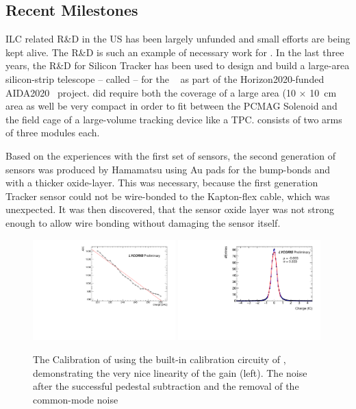 \subsection{Recent Milestones}
ILC related R\&D in the US has been largely unfunded and small efforts are being kept alive. The \KPIX R\&D is such an example of necessary work for \SID.
In the last three years, the R\&D for \KPIX Silicon Tracker has been used to design and build a large-area silicon-strip 
telescope -- called \LYCORIS -- for the \DIITBF~\cite{desytb2018} as part of the Horizon2020-funded AIDA2020~\cite{AIDA2020} project.
\LYCORIS did require both the coverage of a large area (10 $\times$ \SI{10}{\centi\meter} area as well be very compact in order to fit
between the PCMAG Solenoid and the field cage of a large-volume tracking device like a TPC. \LYCORIS consists of two arms of three modules each.

Based on the experiences with the first set of sensors, the second generation of sensors was produced by Hamamatsu 
using Au pads for the \KPIX bump-bonds and with a thicker oxide-layer. This was necessary, because the first generation Tracker sensor could not be 
wire-bonded to the Kapton-flex cable, which was unexpected. It was then discovered, that the sensor oxide layer was not strong enough 
to allow wire bonding without damaging the sensor itself.

\begin{figure}
\includegraphics[width=0.49\textwidth]{Tracker/KPIX/KPIX_Calib_DAC_c0_k0_b0_r0.pdf}
\includegraphics[width=0.49\textwidth]{Tracker/KPIX/KPIX_Gaussian_charge_corr_k0_b0.pdf}
\caption{The Calibration of \LYCORIS using the built-in calibration circuity of \KPIX, demonstrating the very nice linearity of the \KPIX gain (left). The \KPIX noise after the 
successful pedestal subtraction and the removal of the common-mode noise}
\label{fig:SiliconTracking:KPIX:Calibration}
\end{figure}


